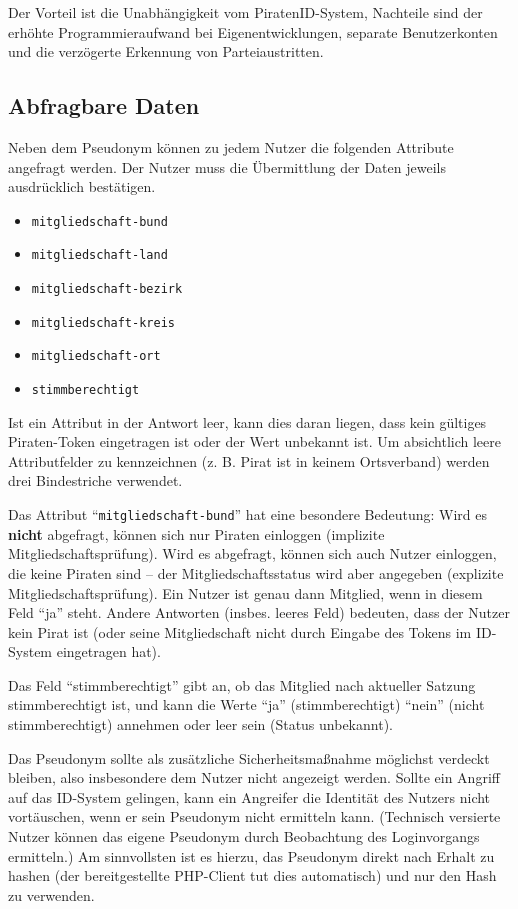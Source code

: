 Der Vorteil ist die Unabhängigkeit vom PiratenID-System, Nachteile sind der erhöhte Programmieraufwand bei Eigenentwicklungen,
separate Benutzerkonten und die verzögerte Erkennung von Parteiaustritten.

\subsection{Abfragbare Daten}
\label{sec:attribute}
Neben dem Pseudonym können zu jedem Nutzer die folgenden Attribute angefragt werden.
Der Nutzer muss die Übermittlung der Daten jeweils ausdrücklich bestätigen.

\begin{itemize}
	\item \texttt{mitgliedschaft-bund}
	\item \texttt{mitgliedschaft-land}
	\item \texttt{mitgliedschaft-bezirk}
	\item \texttt{mitgliedschaft-kreis}
	\item \texttt{mitgliedschaft-ort}
	\item \texttt{stimmberechtigt}
\end{itemize}

Ist ein Attribut in der Antwort leer, kann dies daran liegen, dass kein gültiges Piraten-Token eingetragen ist oder der Wert unbekannt ist.
Um absichtlich leere Attributfelder zu kennzeichnen (z. B. Pirat ist in keinem Ortsverband) werden drei Bindestriche verwendet.

Das Attribut "`\texttt{mitgliedschaft-bund}"' hat eine besondere Bedeutung:
Wird es \textbf{nicht} abgefragt, können sich nur Piraten einloggen (implizite Mitgliedschaftsprüfung).
Wird es abgefragt, können sich auch Nutzer einloggen, die keine Piraten sind -- der Mitgliedschaftsstatus wird aber angegeben (explizite Mitgliedschaftsprüfung).
Ein Nutzer ist genau dann Mitglied, wenn in diesem Feld "`ja"' steht.
Andere Antworten (insbes. leeres Feld) bedeuten, dass der Nutzer kein Pirat ist (oder seine Mitgliedschaft nicht durch Eingabe des Tokens im ID-System eingetragen hat).

Das Feld "`stimmberechtigt"' gibt an, ob das Mitglied nach aktueller Satzung stimmberechtigt ist,
und kann die Werte "`ja"' (stimmberechtigt) "`nein"' (nicht stimmberechtigt) annehmen oder leer sein (Status unbekannt).

Das Pseudonym sollte als zusätzliche Sicherheitsmaßnahme möglichst verdeckt bleiben, also insbesondere dem Nutzer nicht angezeigt werden.
Sollte ein Angriff auf das ID-System gelingen, kann ein Angreifer die Identität des Nutzers nicht vortäuschen, wenn er sein Pseudonym nicht ermitteln kann.
(Technisch versierte Nutzer können das eigene Pseudonym durch Beobachtung des Loginvorgangs ermitteln.)
Am sinnvollsten ist es hierzu, das Pseudonym direkt nach Erhalt zu hashen (der bereitgestellte PHP-Client tut dies automatisch) und nur den Hash zu verwenden.


